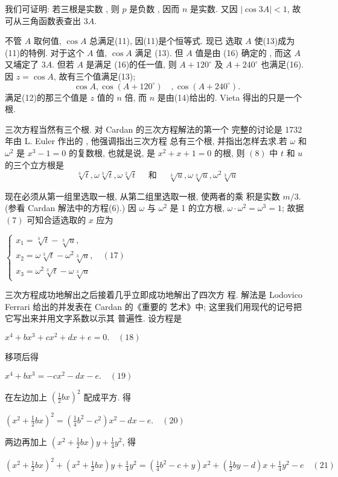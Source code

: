 我们可证明: 若三根是实数 , 则 $p$ 是负数 , 因而 $n$ 是实数. 又因
$|\cos 3 A|<1$, 故可从三角函数表查出 $3 A$.

不管 $A$ 取何值, $\cos A$ 总满足(11), 因(11)是个恒等式. 现已
选取 $A$ 使(13)成为(11)的特例. 对于这个 $A$ 值, $\cos A$ 满足 (13).
但 $A$ 值是由 (16) 确定的 , 而这 $A$ 又埔定了 $3 A$. 但若 $A$ 是满足
(16)的任一值, 则 $A+120^{\circ}$ 及 $A+240^{\circ}$ 也满足(16). 因 $z=\cos A$,
故有三个值满足(13);
\[
\cos A, \cos \left(A+120^{\circ}\right) \quad , \cos \left(A+240^{\circ}\right) .
\]
满足(12)的那三个值是 $z$ 值的 $n$ 倍, 而 $n$ 是由(14)给出的. Vieta
得出的只是一个根.

三次方程当然有三个根. 对 Cardan 的三次方程解法的第一个
完整的讨论是 1732 年由 L. Euler 作出的 , 他强调指出三次方程
总有三个根, 并指出怎样去求.若 $\omega$ 和 $\omega^{2}$ 是 $x^{3}-1=0$ 的复数根,
也就是说, 是 $x^{2}+x+1=0$ 的根, 则 $(8)$ 中 $t$ 和 $u$ 的三个立方根是
\[
\sqrt[3]{t}, \omega \sqrt[3]{t}, \omega \sqrt[2]{t} \quad \text { 和 }  \quad \sqrt[3]{u}, \omega \sqrt[3]{u}, \omega^{2} \sqrt[3]{u}
\]

现在必须从第一组里选取一根, 从第二组里选取一根, 使两者的乘 积是实数 $m / 3$. (参看 Cardan 解法中的方程(6).) 因 $\omega$ 与 $\omega^{2}$ 是 1
的立方根, $\omega \cdot \omega^{2}=\omega^{3}=1$; 故据 $(7)$ 可知合适选取的 $x$ 应为

$\left\{
\begin{array}{l}
	x_{1}=\sqrt[3]{t}-\sqrt[3]{u}, \\
	x_{2}=\omega \sqrt[3]{t}-\omega^{2} \sqrt[3]{u},  \quad (17)\\ 
	x_{3}=\omega^{2} \sqrt[3]{t}-\omega \sqrt[3]{u}
\end{array}\right.$

三次方程成功地解出之后接着几乎立即成功地解出了四次方
程. 解法是 Lodovico Ferrari 给出的并发表在 Cardan 的《重要的
艺术》中; 这里我们用现代的记号把它写出来并用文字系数以示其
普遍性. 设方程是

$x^{4}+b x^{3}+c x^{2}+d x+e=0 . \quad (18)$

移项后得

$x^{4}+b x^{3}=-c x^{2}-d x-e. \quad (19)$

在左边加上 $\left(\frac{1}{2} b x\right)^{2}$ 配成平方. 得

$\left(x^{2}+\frac{1}{2} b x\right)^{2}=\left(\frac{1}{4} b^{2}-c^{2}\right) x^{2}-d x-e . \quad (20)$

两边再加上 $\left(x^{2}+\frac{1}{2} b x\right) y+\frac{1}{4} y^{2}$, 得

$\left(x^{2}+\frac{1}{2} b x\right)^{2}+\left(x^{2}+\frac{1}{2} b x\right) y+\frac{1}{4} y^{2}
=\left(\frac{1}{4} b^{2}-c+y\right) x^{2}+\left(\frac{1}{2} b y-d\right) x+\frac{1}{4} y^{2}-e \quad (21)$

